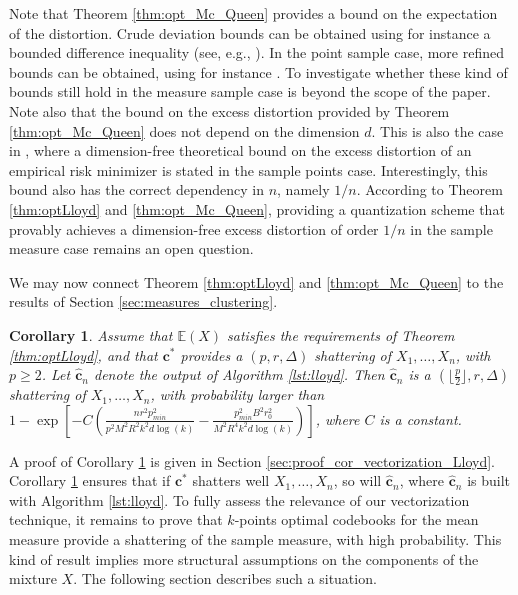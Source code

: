 \documentclass[noinfoline,preprint]{article}
\newtheorem{corollary}[theorem]{Corollary}
\newcommand{\cb}{\mathbf{c}}
\newcommand{\E}{\mathbb{E}}
\renewcommand{\1}{\mathds 1}
\begin{document}
Note that Theorem \ref{thm:opt_Mc_Queen} provides a bound on the expectation of the distortion. Crude deviation bounds can be obtained using for instance a bounded difference inequality (see, e.g., \cite[Theorem 6.2]{Massart13}). In the point sample case, more refined bounds can be obtained, using for instance \cite[Theorem 4.1, Proposition 4.1]{Levrard15}. To investigate whether these kind of bounds still hold in the measure sample case is beyond the scope of the paper. Note also that the bound on the excess distortion provided by Theorem \ref{thm:opt_Mc_Queen} does not depend on the dimension $d$. This is also the case in \cite[Theorem 3.1]{Levrard15}, where a dimension-free theoretical bound on the excess distortion of an empirical risk minimizer is stated in the sample points case. Interestingly, this bound also has the correct dependency in $n$, namely $1/n$. According to Theorem \ref{thm:optLloyd} and \ref{thm:opt_Mc_Queen}, providing a quantization scheme that provably achieves a dimension-free excess distortion of order $1/n$ in the sample measure case remains an open question. 

We may now connect Theorem \ref{thm:optLloyd} and \ref{thm:opt_Mc_Queen} to the results of Section \ref{sec:measures_clustering}.
\begin{corollary}\label{cor:vectorization_Lloyd}
Assume that $\E(X)$ satisfies the requirements of Theorem \ref{thm:optLloyd}, and that $\cb^*$ provides a $(p,r,\Delta)$ shattering of $X_1, \hdots, X_n$, with $p\geq 2$. Let $\hat{\cb}_n$ denote the output of Algorithm \ref{lst:lloyd}. Then $\hat{\cb}_n$ is a $(\lfloor \frac{p}{2} \rfloor ,r,\Delta)$ shattering of $X_1, \hdots, X_n$, with probability larger than $1-\exp{\left [-C\left ( \frac{n r^2 p_{min}^2}{p^2M^2R^2k^2 d \log(k)} - \frac{p_{min}^2 B^2 r_0^2}{M^2 R^4 k^2 d \log(k)} \right ) \right ]}$, where $C$ is a constant.
\end{corollary}
A proof of Corollary \ref{cor:vectorization_Lloyd} is given in Section \ref{sec:proof_cor_vectorization_Lloyd}. Corollary \ref{cor:vectorization_Lloyd} ensures that if $\cb^*$ shatters well $X_1, \hdots, X_n$, so will $\hat{\cb}_n$, where $\hat{\cb}_n$ is built with Algorithm \ref{lst:lloyd}. To fully assess the relevance of our vectorization technique, it remains to prove that $k$-points optimal codebooks for the mean measure provide a shattering of the sample measure, with high probability. This kind of result implies more structural assumptions on the components of the mixture $X$. The following section describes such a situation.
 
\end{document}
